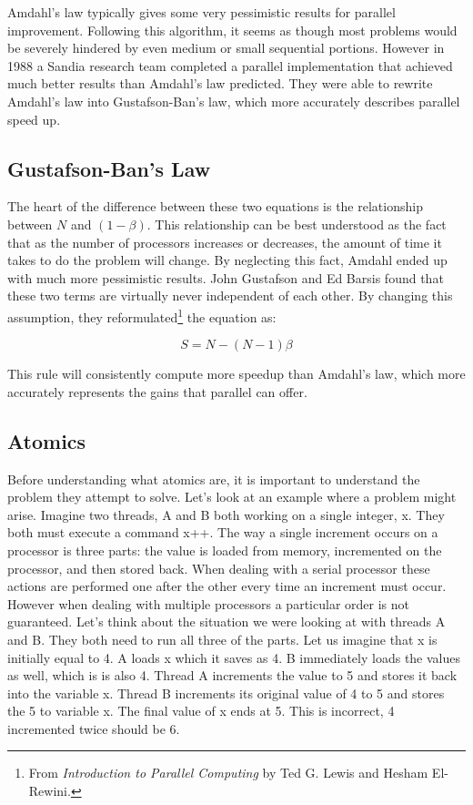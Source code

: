 \documentclass{article}
\newcommand{\comp}[1]{{\ttfamily #1}}
\begin{document}
    Amdahl's law typically gives some very pessimistic results for parallel improvement.  Following this algorithm, it seems as though most problems would be severely hindered by even medium or small sequential portions. However in 1988 a Sandia research team completed a parallel implementation that achieved much better results than Amdahl's law predicted. They were able to rewrite Amdahl's law into Gustafson-Ban's law, which more accurately describes parallel speed up.

    \subsection{Gustafson-Ban's Law}
    The heart of the difference between these two equations is the relationship between $N$ and $(1 - \beta)$. This relationship can be best understood as the fact that as the number of processors increases or decreases, the amount of time it takes to do the problem will change. By neglecting this fact, Amdahl ended up with much more pessimistic results. John Gustafson and Ed Barsis found that these two terms are virtually never independent of each other. By changing this assumption, they reformulated\footnote{From {\it Introduction to Parallel Computing} by Ted G. Lewis and Hesham El-Rewini.} the equation as:

    $$S = N - (N - 1)\beta$$

    This rule will consistently compute more speedup than Amdahl's law, which more accurately represents the gains that parallel can offer.
    
    \subsection{Atomics}
    Before understanding what atomics are, it is important to understand the problem they attempt to solve. Let's look at an example where a problem might arise. Imagine two threads, A and B both working on a single integer, \comp{x}. They both must execute a command \comp{x++}. The way a single increment occurs on a processor is three parts: the value is loaded from memory, incremented on the processor, and then stored back. When dealing with a serial processor these actions are performed one after the other every time an increment must occur. However when dealing with multiple processors a particular order is not guaranteed. Let's think about the situation we were looking at with threads A and B. They both need to run all three of the parts. Let us imagine that \comp{x} is initially equal to 4. A loads \comp{x} which it saves as 4. B immediately loads the values as well, which is is also 4. Thread A increments the value to 5 and stores it back into the variable \comp{x}. Thread B increments its original value of 4 to 5 and stores the 5 to variable \comp{x}. The final value of \comp{x} ends at 5. This is incorrect, 4 incremented twice should be 6.
    
\end{document}
